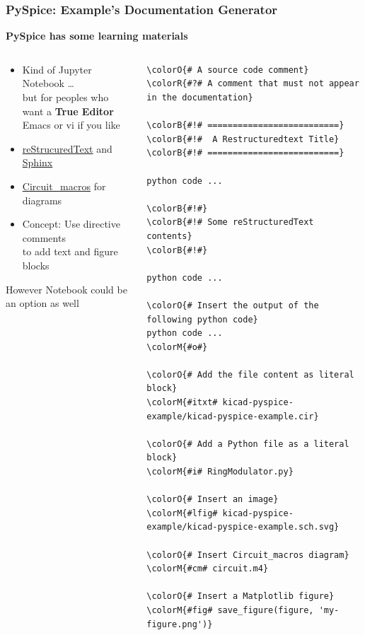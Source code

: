 \begin{frame}[fragile]
  \frametitle{PySpice: Example's Documentation Generator}
  \centerline{\textbf{PySpice has some learning materials}}
  \begin{columns}[T]
    \begin{column}{.6\textwidth}
      \begin{itemize}
      \item Kind of Jupyter Notebook \ldots \\
        but for peoples who want a \textbf{True Editor} \\
        {\small Emacs} {\tiny or vi if you like}
      \item \href{http://docutils.sourceforge.net/rst.html}{reStrucuredText} and \href{http://www.sphinx-doc.org}{Sphinx}
      \item \href{https://ece.uwaterloo.ca/~aplevich/Circuit_macros/}{Circuit\_macros} for diagrams %
      \item Concept: Use directive comments \\
        to add text and figure blocks
      \end{itemize}
      \vspace{1em}
      \alert{However Notebook could be an option as well}
    \end{column}
    \begin{column}{.4\textwidth}
      \fontsize{4.5pt}{4.5pt}\selectfont
\begin{Verbatim}[commandchars=\\\{\}]
\colorO{# A source code comment}
\colorR{#?# A comment that must not appear in the documentation}

\colorB{#!# ==========================}
\colorB{#!#  A Restructuredtext Title}
\colorB{#!# ==========================}

python code ...

\colorB{#!#}
\colorB{#!# Some reStructuredText contents}
\colorB{#!#}

python code ...

\colorO{# Insert the output of the following python code}
python code ...
\colorM{#o#}

\colorO{# Add the file content as literal block}
\colorM{#itxt# kicad-pyspice-example/kicad-pyspice-example.cir}

\colorO{# Add a Python file as a literal block}
\colorM{#i# RingModulator.py}

\colorO{# Insert an image}
\colorM{#lfig# kicad-pyspice-example/kicad-pyspice-example.sch.svg}

\colorO{# Insert Circuit_macros diagram}
\colorM{#cm# circuit.m4}

\colorO{# Insert a Matplotlib figure}
\colorM{#fig# save_figure(figure, 'my-figure.png')}
\end{Verbatim}
      \normalsize
    \end{column}
  \end{columns}
\end{frame}


